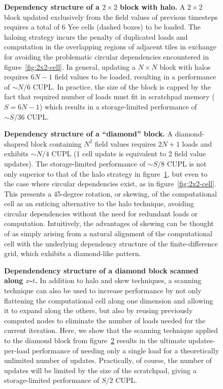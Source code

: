 \documentclass[12pt]{article}
\newcommand{\myfig}[3]{
  \begin{figure}[bp]
		\begin{center}
			
      \caption{\textbf{#2}#3\label{fig:#1}}
		\end{center}
	\end{figure}
}
\begin{document}
\myfig{2x2-halo}{
  Dependency structure of a $2 \times 2$ block with halo.}{
	A $2\times2$ block updated exclusively
    from the field values of previous timesteps
	  requires a total of 6 Yee cells (dashed boxes) to be loaded.
  The haloing strategy incurs the penalty
    of duplicated loads and computation 
    in the overlapping regions of adjacent tiles
    in exchange for avoiding the problematic circular dependencies
    encountered in figure~\ref{fig:2x2-cell}.
	In general, updating a $N \times N$ block with halos requires
	  $6N - 1$ field values to be loaded,
	  resulting in a performance of $\sim N/6$ CUPL.
  In practice, the size of the block is capped 
    by the fact that required number of loads
    must fit in scratchpad memory ($S = 6N - 1$)
    which results in a storage-limited performance of $\sim S/36$ CUPL.
}

\myfig{block-diamond}{
  Dependency structure of a ``diamond'' block.}{
	A diamond-shapred block containing $N^2$ field values
    requires $2N + 1$ loads and exhibits $\sim N/4$ CUPL
	  (1 cell update is equivalent to 2 field value updates).
  The storage-limited performance of $\sim S/8$ CUPL is not only superior
    to that of the halo strategy in figure~\ref{fig:2x2-halo},
    but even to the case where circular dependencies exist,
    as in figure~\ref{fig:2x2-cell}.
  This presents a 45-degree rotation, or skewing,
    of the computational cell as an enticing alternative to the halo technique,
    avoiding circular dependencies
    without the need for redundant loads or computation.
  Intuitively, the advantages of skewing
    can be thought of as simply arising
    from a natural alignment of the computational cell
    with the underlying dependency structure of the finite-difference grid,
    which exhibits a diamond-like pattern.
}
\myfig{diagonal-drag}{
  Dependendency structure of a diamond block scanned along $x$-$t$.}{
  In addition to halo and skew techniques,
    a scanning technique can also be used to increase performance
    by not only flattening the computational cell along one dimension
    and allowing it to expand along the others,
    but also by reusing previously computed nodes
    to eliminate the number of loads needed for the current iteration.
  Here, we show that the scanning technique applied
    to the diamond block from figure~\ref{fig:block-diamond}
    results in the ultimate updates-per-load performance
    of needing only a single load
    for a theoretically unlimited number of updates.
  Practically, of course,
    the number of updates will be limited by the size of the scratchpad,
    giving a storage-limited performance of $S / 2$ CUPL.
}
\end{document}
